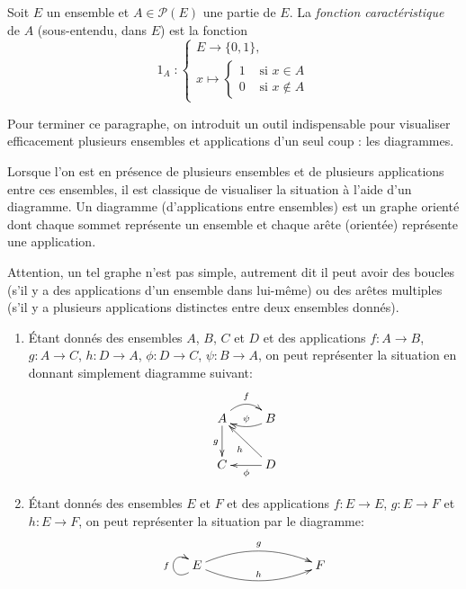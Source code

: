 \begin{definition}
Soit $E$ un ensemble et $A\in \mathcal P(E)$ une partie de $E$. La \emph{fonction caractéristique} de $A$ (sous-entendu, dans $E$) est la fonction 
\[
\operatorname{1}_A :\begin{cases}E \to \{0,1\},\\ x\mapsto \begin{cases}1&\text{ si } x\in A\\0&\text{ si } x\not\in A\end{cases}\end{cases}
\]
\end{definition}



Pour terminer ce paragraphe, on introduit un outil indispensable pour visualiser efficacement plusieurs ensembles et applications d'un seul coup : les diagrammes.

\begin{definition}[Diagramme]
Lorsque l'on est en présence de plusieurs ensembles et de plusieurs applications entre ces ensembles, il est classique de visualiser la situation à l'aide d'un diagramme. Un diagramme (d'applications entre ensembles) est un graphe orienté dont chaque sommet représente un ensemble et chaque arête (orientée) représente une application.
\end{definition}

Attention, un tel graphe n'est pas simple, autrement dit il peut avoir des boucles (s'il y a des applications d'un ensemble dans lui-même) ou des arêtes multiples (s'il y a plusieurs applications distinctes entre deux ensembles donnés).

\begin{exemple}
\begin{enumerate}
\item \'Etant donnés des ensembles $A$, $B$, $C$ et $D$ et des applications $f : A\to B$, $g : A\to C$, $h : D\to A$, $\phi : D\to C$, $\psi : B\to A$, on peut représenter la situation en donnant simplement diagramme suivant:
\[
\xymatrix{
A \ar@/^1pc/[r]^{f} \ar[d]_{g} & B \ar@/^/[l]_{\psi}\\
C & D \ar[ul]^{h} \ar[l]^{\phi}
}
\]
\item \'Etant donnés des ensembles $E$ et $F$ et des applications $f : E\to E$, $g : E\to F$ et $h : E\to F$, on peut représenter la situation par le diagramme:
\[
\xymatrix{
 E \ar@(dl,ul)^{f} \ar@/^1pc/[rrr]^{g} \ar@/_1pc/[rrr]^{h}
& & &  F 
}
\]
\end{enumerate}
\end{exemple}

